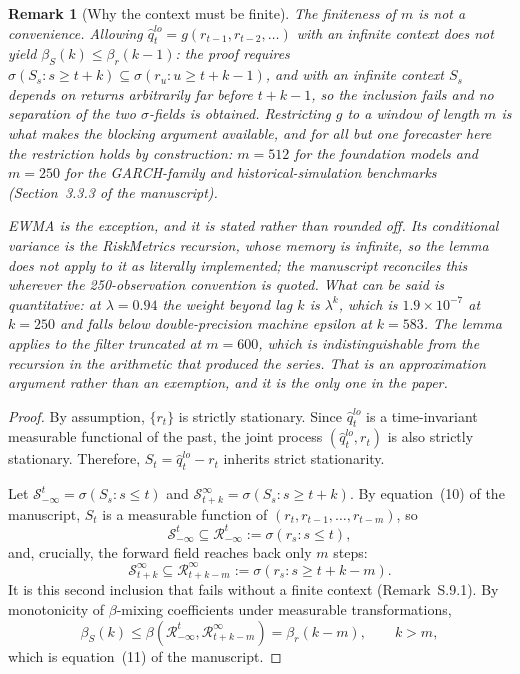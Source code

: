 \documentclass[preprint,11pt,authoryear]{elsarticle}
\newtheorem{remark}[theorem]{Remark}
\newcommand{\1}{\boldsymbol{1}}
\begin{document}
\begin{remark}[Why the context must be finite]
	\label{rem:finite_context}
	The finiteness of $m$ is not a convenience. Allowing
	$\hat q_t^{lo}=g(r_{t-1},r_{t-2},\ldots)$ with an infinite context does not
	yield $\beta_S(k)\le\beta_r(k-1)$: the proof requires
	$\sigma(S_s : s\ge t+k)\subseteq\sigma(r_u : u\ge t+k-1)$, and with an
	infinite context $S_s$ depends on returns arbitrarily far before $t+k-1$,
	so the inclusion fails and no separation of the two $\sigma$-fields is
	obtained. Restricting $g$ to a window of length $m$ is what makes the
	blocking argument available, and for all but one forecaster here the
	restriction holds by construction: $m = 512$ for the foundation models and
	$m = 250$ for the GARCH-family and historical-simulation benchmarks
	(Section~3.3.3 of the manuscript).

	EWMA is the exception, and it is stated rather than rounded off. Its
	conditional variance is the RiskMetrics recursion, whose memory is infinite,
	so the lemma does not apply to it as literally implemented; the manuscript
	reconciles this wherever the 250-observation convention is quoted. What can be
	said is quantitative: at $\lambda = 0.94$ the weight beyond lag $k$ is
	$\lambda^k$, which is $1.9\times10^{-7}$ at $k = 250$ and falls below
	double-precision machine epsilon at $k = 583$. The lemma applies to the filter
	truncated at $m = 600$, which is indistinguishable from the recursion in the
	arithmetic that produced the series. That is an approximation argument rather
	than an exemption, and it is the only one in the paper.
\end{remark}

\begin{proof}
	By assumption, $\{r_t\}$ is strictly stationary. Since $\hat q_t^{lo}$ is
	a time-invariant measurable functional of the past, the joint process
	$(\hat q_t^{lo},r_t)$ is also strictly stationary. Therefore,
	$S_t=\hat q_t^{lo}-r_t$ inherits strict stationarity.
	
	Let $\mathcal S_{-\infty}^t=\sigma(S_s:s\le t)$ and
	$\mathcal S_{t+k}^{\infty}=\sigma(S_s:s\ge t+k)$. By
	equation~(10) of the manuscript, $S_t$ is a measurable function of
	$(r_t,r_{t-1},\ldots,r_{t-m})$, so
	\[
	\mathcal S_{-\infty}^t
	\subseteq
	\mathcal R_{-\infty}^t:=\sigma(r_s:s\le t),
	\]
	and, crucially, the forward field reaches back only $m$ steps:
	\[
	\mathcal S_{t+k}^{\infty}
	\subseteq
	\mathcal R_{t+k-m}^{\infty}:=\sigma(r_s:s\ge t+k-m).
	\]
	It is this second inclusion that fails without a finite context
	(Remark~S.9.1).
	By monotonicity of $\beta$-mixing coefficients under measurable
	transformations,
	\[
	\beta_S(k)
	\le
	\beta(\mathcal R_{-\infty}^t,\mathcal R_{t+k-m}^{\infty})
	=
	\beta_r(k-m),
	\qquad k>m,
	\]
	which is equation~(11) of the manuscript.
\end{proof}
\end{document}
